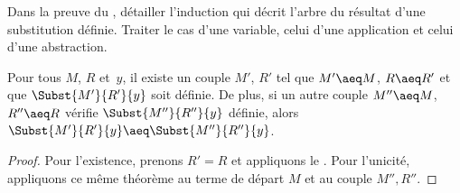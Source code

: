 \documentclass[../../../include/open-logic-section]{subfiles}
\begin{document}
\begin{prob}
Dans la preuve du , détailler
l'induction qui décrit l'arbre du résultat d'une substitution
définie. Traiter le cas d'une variable, celui d'une application
et celui d'une abstraction.
\end{prob}

\begin{cor}
Pour tous $M$, $R$ et~$y$, il existe un couple
$M'$, $R'$ tel que $M' \aeq M$,
$R \aeq R'$ et que $\Subst{M'}{R'}{y}$
soit définie. De plus, si un autre couple
$M'' \aeq M$, $R'' \aeq R$ vérifie
$\Subst{M''}{R''}{y}$ définie, alors
$\Subst{M'}{R'}{y} \aeq
\Subst{M''}{R''}{y}$.
\end{cor}

\begin{proof}
Pour l'existence, prenons $R'=R$ et appliquons le
. Pour l'unicité, appliquons ce même
théorème au terme de départ $M$ et au couple $M'',R''$.
\end{proof}
\end{document}
